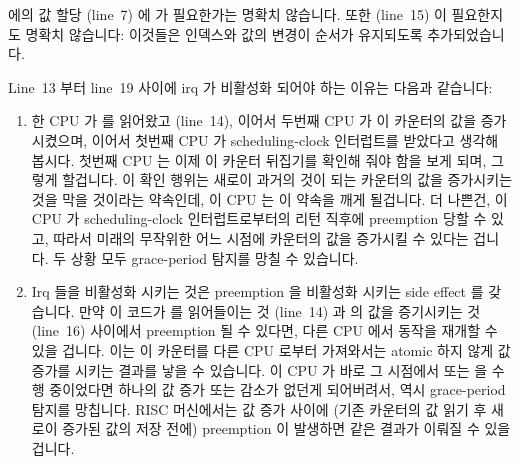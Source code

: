  에의 값 할당 (line~7) 에  가 필요한가는 명확치
않습니다.
또한  (line~15) 이 필요한지도 명확치 않습니다:
이것들은 인덱스와 값의 변경이 순서가 유지되도록 추가되었습니다.

Line~13 부터 line~19 사이에 irq 가 비활성화 되어야 하는 이유는 다음과 같습니다:

\begin{enumerate}
\item	한 CPU 가  를 읽어왔고 (line~14), 이어서
	두번째 CPU 가 이 카운터의 값을 증가시켰으며, 이어서 첫번째 CPU 가
	scheduling-clock 인터럽트를 받았다고 생각해 봅시다.
	첫번째 CPU 는 이제 이 카운터 뒤집기를 확인해 줘야 함을 보게 되며,
	그렇게 할겁니다.
	이 확인 행위는 새로이 과거의 것이 되는 카운터의 값을 증가시키는 것을
	막을 것이라는 약속인데, 이 CPU 는 이 약속을 깨게 될겁니다.
	더 나쁜건, 이 CPU 가 scheduling-clock 인터럽트로부터의 리턴 직후에
	preemption 당할 수 있고, 따라서 미래의 무작위한 어느 시점에 카운터의
	값을 증가시킬 수 있다는 겁니다.
	두 상황 모두 grace-period 탐지를 망칠 수 있습니다.

\item	Irq 들을 비활성화 시키는 것은 preemption 을 비활성화 시키는 side effect
	를 갖습니다.
	만약 이 코드가  를 읽어들이는 것 (line~14) 과
	 의 값을 증기시키는 것 (line~16) 사이에서 preemption 될
	수 있다면, 다른 CPU 에서 동작을 재개할 수 있을 겁니다.
	이는 이 카운터를 다른 CPU 로부터 가져와서는 atomic 하지 않게 값 증가를
	시키는 결과를 낳을 수 있습니다.
	이 CPU 가 바로 그 시점에서  또는
	 을 수행 중이었다면 하나의 값 증가 또는 감소가
	없던게 되어버려서, 역시 grace-period 탐지를 망칩니다.
	RISC 머신에서는 값 증가 사이에  (기존 카운터의 값 읽기 후 새로이 증가된
	값의 저장 전에) preemption 이 발생하면 같은 결과가 이뤄질 수 있을
	겁니다.
\iffalse


\end{enumerate}
